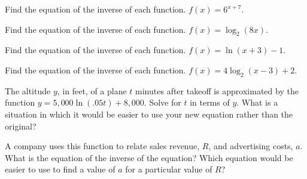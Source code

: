 \documentclass{article}
\newenvironment{practice}[2]{}{}        %
\newcommand{\answer}[1]{}               %
\newcommand{\placeholder}[2]{}          %
\begin{document}
\begin{practice}{23}{1}
Find the equation of the inverse of each function. $f(x)=6^{x+7}$.
\answer{$f^{-1}(x)=\log_6x-7$}
\end{practice}

\begin{practice}{24}{1}
Find the equation of the inverse of each function. $f(x)=\log_2(8x)$.
\answer{$f^{-1}(x)=\frac{2^x}{8}$}
\end{practice}

\begin{practice}{25}{2}
Find the equation of the inverse of each function. $f(x)=\ln(x+3)-1$.
\answer{$f^{-1}(x)=e^{x+1}-3$}
\end{practice}

\begin{practice}{26}{2}
Find the equation of the inverse of each function. $f(x)=4\log_2(x-3)+2$.
\answer{$f^{-1}(x)=2^{\frac{x-2}{4}}+3$}
\end{practice}

\begin{practice}{27}{2}
The altitude $y$, in feet, of a plane $t$ minutes after takeoff is approximated by the function $y=5{,}000\ln(.05t)+8{,}000$. Solve for $t$ in terms of $y$. What is a situation in which it would be easier to use your new equation rather than the original?
\answer{$t=20e^{\frac{y-8{,}000}{5{,}000}}$; Use this new equation when the altitude of the plane is known but the time since takeoff is not.}
\end{practice}

\begin{practice}{28}{3}
A company uses this function to relate sales revenue, $R$, and advertising costs, $a$. What is the equation of the inverse of the equation? Which equation would be easier to use to find a value of $a$ for a particular value of $R$?

\placeholder{illustration}{Sales revenue represented by stacks of coins labeled "Sales Revenue, R" and advertising costs represented by a web ad and phone labeled "Advertising Costs, a" with formula $R=12\log(a+1)+25$.}
\answer{The inverse of the formula is $a=10^{\frac{R-25}{12}}-1$. It would be easier to use the inverse to find $a$ when $R$ is known.}
\end{practice}
\end{document}
